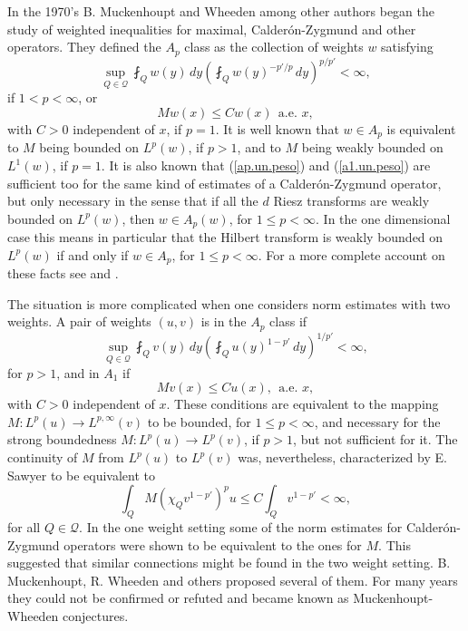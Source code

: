 \documentclass[11pt]{amsart}
\theoremstyle{definition}
\begin{document}
In the 1970's B. Muckenhoupt and Wheeden among other authors began the study of weighted inequalities for maximal, Calder\'on-Zygmund and other operators. They defined the $A_p$ class as the collection of weights $w$ satisfying 
\begin{equation}\label{ap.un.peso}
\sup_{Q\in \mathcal Q} \fint_Q w(y)\,dy \left(\fint_Q w(y)^{-p'/p}\,dy\right)^{p/p'} < \infty,
\end{equation}
if $1<p<\infty$, or 
\begin{equation}\label{a1.un.peso}
Mw(x) \leq C w(x)\ \ \mbox{a.e. } x,
\end{equation}
with $C>0$ independent of $x$, if $p=1$. It is well known that $w\in A_p$ is equivalent to $M$ being bounded on $L^p(w)$, if $p>1$, and to $M$ being weakly bounded on $L^1(w)$, if $p=1$. It is also known that (\ref{ap.un.peso}) and (\ref{a1.un.peso}) are sufficient too for the same kind of estimates of a Calder\'on-Zygmund operator, but only necessary in the sense that if all the $d$ Riesz transforms are weakly bounded on $L^p(w)$, then $w\in A_p(w)$, for $1\leq p<\infty$. In the one dimensional case this means in particular that the Hilbert transform is weakly bounded on $L^p(w)$ if and only if $w\in A_p$, for $1\leq p<\infty$. For a more complete account on these facts see \cite{GarciaCuervaRubiodeFrancia} and \cite{Grafakos}.

\bigskip

The situation is more complicated when one considers norm estimates with two weights. A pair of weights $(u,v)$ is in the $A_p$ class if
\begin{equation}\label{ap.dos.pesos}
\sup_{Q\in \mathcal Q} \fint_Q v(y)\,dy \left(\fint_Q u(y)^{1-p'}\,dy\right)^{1/p'}<\infty,
\end{equation}
for $p>1$, and in $A_1$ if
\begin{equation}\label{a1.dos.pesos}
Mv(x)\leq C u(x),\ \ \mbox{a.e. } x,
\end{equation}
with $C>0$ independent of $x$. These conditions are equivalent to the mapping $M:L^p(u)\rightarrow L^{p,\infty}(v)$ to be bounded, for $1\leq p<\infty$, and necessary for the strong boundedness $M:L^p(u)\rightarrow L^p(v)$, if $p>1$, but not sufficient for it. The continuity of $M$ from $L^p(u)$ to $L^p(v)$ was, nevertheless, characterized by E. Sawyer \cite{Sawyer} to be equivalent to
\[
\int_Q M(\chi_Q v^{1-p'})^p u \leq C \int_Q v^{1-p'}<\infty,
\]
for all $Q\in \mathcal Q$. In the one weight setting some of the norm estimates for Calder\'on-Zygmund operators were shown to be equivalent to the ones for $M$. This suggested that similar connections might be found in the two weight setting. B. Muckenhoupt, R. Wheeden and others proposed several of them. For many years they could not be confirmed or refuted and became known as Muckenhoupt-Wheeden conjectures. 
\end{document}
